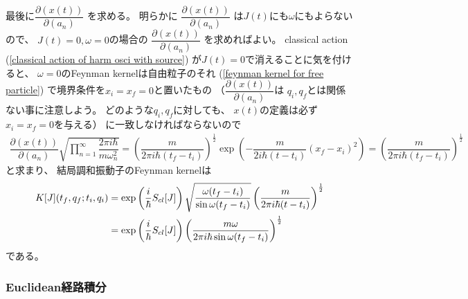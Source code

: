 最後に$\dfrac{ \partial ( x(t) ) }{ \partial (a_n) }$
を求める。
明らかに
$\dfrac{ \partial ( x(t) ) }{ \partial (a_n) }$
は$J(t)$にも$\omega$にもよらないので、
$J(t) = 0, \omega = 0$の場合の
$\dfrac{ \partial ( x(t) ) }{ \partial (a_n) }$
を求めればよい。
classical action
(\ref{classical action of harm osci with source})
が$J(t) = 0$で消えることに気を付けると、
$\omega = 0$のFeynman kernelは自由粒子のそれ
(\ref{feynman kernel for free particle})
で境界条件を$x_i = x_f = 0$と置いたもの
（$\dfrac{ \partial ( x(t) ) }{ \partial (a_n) }$は
$q_i, q_f$とは関係ない事に注意しよう。
どのような$q_i, q_f$に対しても、
$x(t)$の定義は必ず$x_i = x_f = 0$を与える）
に一致しなければならないので
\begin{align}
    \dfrac{ \partial ( x(t) ) }{ \partial (a_n) }
    \sqrt{
        \prod_{n=1}^\infty
        \dfrac{
            2 \pi i \hbar
        }{
            m \omega_n^2
        }
    }
    =
    \left(
        \dfrac{ m }{ 2 \pi i \hbar ( t_f - t_i ) }
    \right)^{\frac{1}{2}}
    \exp\left(
        -
        \dfrac{ m }{ 2 i \hbar (t - t_i) }
        (x_f - x_i)^2
    \right)
    =
    \left(
        \dfrac{ m }{ 2 \pi i \hbar ( t_f - t_i ) }
    \right)^{\frac{1}{2}}
\end{align}
と求まり、
結局調和振動子のFeynman kernelは
\begin{align}
    K[J]( t_f, q_f ; t_i, q_i )
    &=
    \exp\left(
        \dfrac{i}{\hbar} S_{cl} [J]
    \right)
    \sqrt{
        \dfrac{
            \omega (t_f - t_i)
        }{
            \sin \omega (t_f - t_i)
        }
    }
    \left(
        \dfrac{ m }{ 2 \pi i \hbar ( t - t_i ) }
    \right)^{\frac{1}{2}}
\notag\\&=
    \exp\left(
        \dfrac{i}{\hbar} S_{cl} [J]
    \right)
    \left(
        \dfrac{ 
            m \omega
        }{
            2 \pi i \hbar
            \sin \omega (t_f - t_i)
        }
    \right)^{\frac{1}{2}}
\label{feynman kernel of harmonic oscillator with source}
\end{align}
である。

\subsubsection{Euclidean経路積分}

